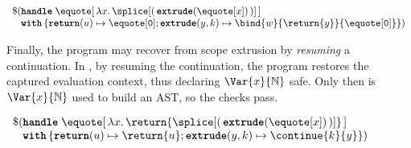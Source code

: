 \begin{code} 
 \begin{source}
  $\begin{array}{l}
      \$(\textbf{\texttt{handle}} \; \equote[\,{\lambda x. \,\splice[(\,{{\textbf{\texttt{extrude}}(\equote[x])}}\,)]}\,] \\
      \;\;\,\, \textbf{\texttt{with}} \, \{ \textbf{\texttt{return}}(u) \mapsto {\equote[\texttt{0}]}; \textbf{\texttt{extrude}}(y, k) \mapsto {\bind{w}{\return{y}}{\equote[\texttt{0}]}}\})
    \end{array}$
 \end{source}
 \label{listing:eager-scope-extrusion-unsafe-no-use}
\end{code}

Finally, the program may recover from scope extrusion by \textit{resuming} a continuation. In , by resuming the continuation, the program restores the captured evaluation context, thus declaring $\Var{x}{\mathbb{N}}$ safe. Only then is $\Var{x}{\mathbb{N}}$ used to build an AST, so the checks pass.

\begin{code} 
 \begin{source}
  $\begin{array}{l}
      \$ (\textbf{\texttt{handle}} \; \equote[\, {\lambda x. \,\return{\splice[( \, {{\textbf{\texttt{extrude}}(\equote[x])}} \,)]}} \,] \\
      \;\;\,\, \textbf{\texttt{with}} \, \{ \textbf{\texttt{return}}(u) \mapsto {\return{u}}; \textbf{\texttt{extrude}}(y, k) \mapsto {{\continue{k}{y}}}\})
    \end{array}$
 \end{source}
 \label{listing:eager-scope-extrusion-unsafe-continue}
\end{code}


